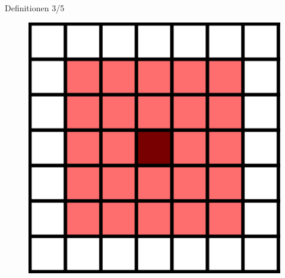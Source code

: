 \documentclass[aspectratio=169]{beamer}
\begin{document}
\begin{frame}{Definitionen 3/5}
\begin{multicols*}{2}
\begin{multicols*}{2}
        \begin{figure}[H]
          \centering
          \includegraphics[width = 0.28 \textheight]{moore_2.png}
        \end{figure}

      \end{multicols*}


      \vfill\null

      \pause



\end{multicols*}
\end{frame}
\end{document}
